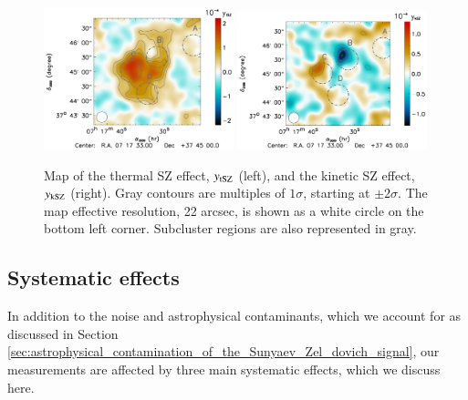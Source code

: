 \documentclass[twocolumn,traditabstract]{aa}
\begin{document}
\begin{figure}[h]
\centering
\includegraphics[width=0.49\textwidth]{Figure/MACSJ0717_tSZ_map.pdf}
\includegraphics[width=0.49\textwidth]{Figure/MACSJ0717_kSZ_map.pdf}
\caption{\footnotesize{Map of the thermal SZ effect, $y_{\rm tSZ}$ (left), and the kinetic SZ effect, $y_{\rm kSZ}$ (right). Gray contours are multiples of $1 \sigma$, starting at $\pm 2 \sigma$. The map effective resolution, 22 arcsec, is shown as a white circle on the bottom left corner. Subcluster regions are also represented in gray.}}
\label{fig:tSZ_kSZ_maps}
\end{figure}

\subsection{Systematic effects}
In addition to the noise and astrophysical contaminants, which we account for as discussed in Section \ref{sec:astrophysical_contamination_of_the_Sunyaev_Zel_dovich_signal}, our measurements are affected by three main systematic effects, which we discuss here.
\end{document}
